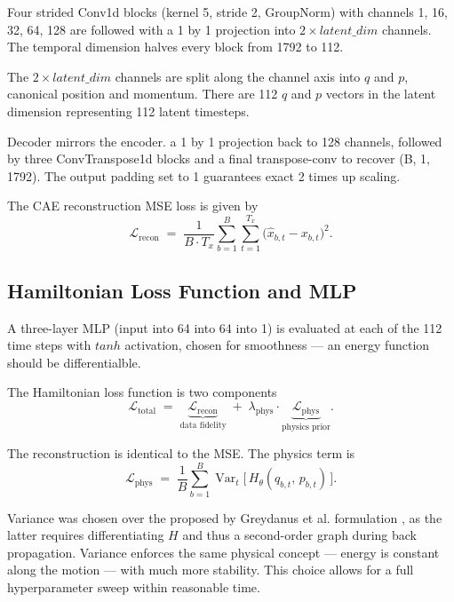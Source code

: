 \documentclass[conference]{IEEEtran}
\begin{document}
Four strided Conv1d blocks (kernel 5, stride 2, GroupNorm) with channels 1, 16, 32, 64, 128 are followed with a 1 by 1 projection into $2 \times latent\_dim$ channels. The temporal dimension halves every block from 1792 to 112.

The $2 \times latent\_dim$ channels are split along the channel axis into $q$ and $p$, canonical position and momentum. There are 112 $q$ and $p$ vectors in the latent dimension representing 112 latent timesteps.

Decoder mirrors the encoder. a 1 by 1 projection back to 128 channels, followed by three ConvTranspose1d blocks and a final transpose-conv to recover (B, 1, 1792). The output padding set to 1 guarantees exact 2 times up scaling.

The CAE reconstruction MSE loss is given by
\begin{equation}
\mathcal{L}_{\text{recon}} \;=\; \frac{1}{B \cdot T_x} \sum_{b=1}^{B} \sum_{t=1}^{T_x} \bigl( \hat{x}_{b,t} - x_{b,t} \bigr)^{2}.
\end{equation}

\subsection{Hamiltonian Loss Function and MLP}
A three-layer MLP (input into 64 into 64 into 1) is evaluated at each of the 112 time steps with $tanh$ activation, chosen for smoothness --- an energy function should be differentialble.

The Hamiltonian loss function is two components
\begin{equation}
\mathcal{L}_{\text{total}} \;=\; \underbrace{\mathcal{L}_{\text{recon}}}_{\text{data fidelity}} \;+\; \lambda_{\text{phys}} \cdot \underbrace{\mathcal{L}_{\text{phys}}}_{\text{physics prior}}.
\end{equation}

The reconstruction is identical to the MSE.
The physics term is
\begin{equation}
    \mathcal{L}_{\text{phys}} \;=\; \frac{1}{B} \sum_{b=1}^{B} \operatorname{Var}_{t}\!\bigl[\, H_{\theta}(q_{b,t},\, p_{b,t}) \,\bigr].
\end{equation}

Variance was chosen over the proposed by Greydanus et al. formulation \cite{Greydanus2019}, as the latter requires differentiating $H$ and thus a second-order graph during back propagation. Variance enforces the same physical concept --- energy is constant along the motion --- with much more stability. This choice allows for a full hyperparameter sweep within reasonable time.
\end{document}
